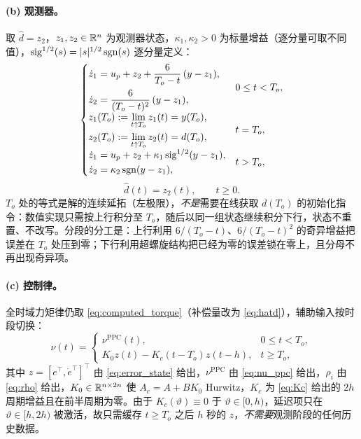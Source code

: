 \paragraph{(b) 观测器。}
取 \(\hat d=z_2\)，\(z_1,z_2\in\mathbb R^n\) 为观测器状态，\(\kappa_1,\kappa_2>0\) 为标量增益（逐分量可取不同值），\(\operatorname{sig}^{1/2}(s)=\lvert s\rvert^{1/2}\operatorname{sgn}(s)\) 逐分量定义：
\begin{equation}
\begin{cases}
\begin{aligned}
\dot z_1&=u_p+z_2+\dfrac{6}{T_o-t}\,(y-z_1),\\[2pt]
\dot z_2&=\dfrac{6}{(T_o-t)^{2}}\,(y-z_1),
\end{aligned}
&0\le t<T_o,\\[10pt]
\begin{aligned}
z_1(T_o)&:=\lim_{t\uparrow T_o}z_1(t)=y(T_o),\\
z_2(T_o)&:=\lim_{t\uparrow T_o}z_2(t)=d(T_o),
\end{aligned}
&t=T_o,\\[10pt]
\begin{aligned}
\dot z_1&=u_p+z_2+\kappa_1\operatorname{sig}^{1/2}(y-z_1),\\
\dot z_2&=\kappa_2\operatorname{sgn}(y-z_1),
\end{aligned}
&t>T_o,
\end{cases}
\label{eq:ptdo}
\end{equation}
\begin{equation}
\hat d(t)=z_2(t),\qquad t\ge0 .
\label{eq:hatd}
\end{equation}
\(T_o\) 处的等式是解的连续延拓（左极限），\emph{不是}需要在线获取 \(d(T_o)\) 的初始化指令：数值实现只需按上行积分至 \(T_o\)，随后以同一组状态继续积分下行，状态不重置、不改写。分段的分工是：上行利用 \(6/(T_o-t)\)、\(6/(T_o-t)^2\) 的奇异增益把误差在 \(T_o\) 处压到零；下行利用超螺旋结构把已经为零的误差锁在零上，且分母不再出现奇异项。

\paragraph{(c) 控制律。}
全时域力矩律仍取 \eqref{eq:computed_torque}（补偿量改为 \eqref{eq:hatd}），辅助输入按时段切换：
\begin{equation}
\nu(t)=
\begin{cases}
\nu^{\mathrm{PPC}}(t), & 0\le t<T_o,\\[2pt]
K_0z(t)-K_c(t-T_o)z(t-h), & t\ge T_o,
\end{cases}
\label{eq:nu_schedule}
\end{equation}
其中 \(z=[e^{\top},\dot e^{\top}]^{\top}\) 由 \eqref{eq:error_state} 给出，\(\nu^{\mathrm{PPC}}\) 由 \eqref{eq:nu_ppc} 给出，\(\rho_i\) 由 \eqref{eq:rho} 给出，\(K_0\in\mathbb R^{n\times2n}\) 使 \(A_c=A+BK_0\) Hurwitz，\(K_c\) 为 \eqref{eq:Kc} 给出的 \(2h\) 周期增益且在前半周期为零。由于 \(K_c(\vartheta)\equiv0\) 于 \(\vartheta\in[0,h)\)，延迟项只在 \(\vartheta\in[h,2h)\) 被激活，故只需缓存 \(t\ge T_o\) 之后 \(h\) 秒的 \(z\)，\emph{不需要}观测阶段的任何历史数据。

